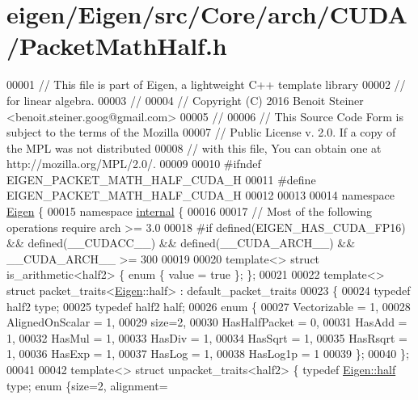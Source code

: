 \hypertarget{eigen_2_eigen_2src_2_core_2arch_2_c_u_d_a_2_packet_math_half_8h_source}{}\section{eigen/\+Eigen/src/\+Core/arch/\+C\+U\+D\+A/\+Packet\+Math\+Half.h}
\label{eigen_2_eigen_2src_2_core_2arch_2_c_u_d_a_2_packet_math_half_8h_source}

\begin{DoxyCode}
00001 \textcolor{comment}{// This file is part of Eigen, a lightweight C++ template library}
00002 \textcolor{comment}{// for linear algebra.}
00003 \textcolor{comment}{//}
00004 \textcolor{comment}{// Copyright (C) 2016 Benoit Steiner <benoit.steiner.goog@gmail.com>}
00005 \textcolor{comment}{//}
00006 \textcolor{comment}{// This Source Code Form is subject to the terms of the Mozilla}
00007 \textcolor{comment}{// Public License v. 2.0. If a copy of the MPL was not distributed}
00008 \textcolor{comment}{// with this file, You can obtain one at http://mozilla.org/MPL/2.0/.}
00009 
00010 \textcolor{preprocessor}{#ifndef EIGEN\_PACKET\_MATH\_HALF\_CUDA\_H}
00011 \textcolor{preprocessor}{#define EIGEN\_PACKET\_MATH\_HALF\_CUDA\_H}
00012 
00013 
00014 \textcolor{keyword}{namespace }\hyperlink{namespace_eigen}{Eigen} \{
00015 \textcolor{keyword}{namespace }\hyperlink{namespaceinternal}{internal} \{
00016 
00017 \textcolor{comment}{// Most of the following operations require arch >= 3.0}
00018 \textcolor{preprocessor}{#if defined(EIGEN\_HAS\_CUDA\_FP16) && defined(\_\_CUDACC\_\_) && defined(\_\_CUDA\_ARCH\_\_) && \_\_CUDA\_ARCH\_\_ >= 300}
00019 
00020 \textcolor{keyword}{template}<> \textcolor{keyword}{struct }is\_arithmetic<half2> \{ \textcolor{keyword}{enum} \{ value = \textcolor{keyword}{true} \}; \};
00021 
00022 \textcolor{keyword}{template}<> \textcolor{keyword}{struct }packet\_traits<\hyperlink{namespace_eigen}{Eigen}::half> : default\_packet\_traits
00023 \{
00024   \textcolor{keyword}{typedef} half2 type;
00025   \textcolor{keyword}{typedef} half2 half;
00026   \textcolor{keyword}{enum} \{
00027     Vectorizable = 1,
00028     AlignedOnScalar = 1,
00029     size=2,
00030     HasHalfPacket = 0,
00031     HasAdd    = 1,
00032     HasMul    = 1,
00033     HasDiv    = 1,
00034     HasSqrt   = 1,
00035     HasRsqrt  = 1,
00036     HasExp    = 1,
00037     HasLog    = 1,
00038     HasLog1p  = 1
00039   \};
00040 \};
00041 
00042 \textcolor{keyword}{template}<> \textcolor{keyword}{struct }unpacket\_traits<half2> \{ \textcolor{keyword}{typedef} \hyperlink{struct_eigen_1_1half}{Eigen::half} type; \textcolor{keyword}{enum} \{size=2, alignment=

\end{DoxyCode}
